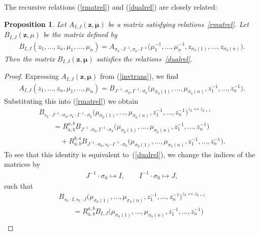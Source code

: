 \documentclass[10pt,a4paper]{amsart}
\def\zz{{\boldsymbol z}}
\def\mub{{\boldsymbol\mu}}
\numberwithin{equation}{section}
\newtheorem{Proposition}[Theorem]{Proposition}
 { \theoremstyle{definition}
\newtheorem{Definition}[Theorem]{Definition}
\newtheorem{Note}[Theorem]{Note}
\newtheorem{Example}[Theorem]{Example}
\newtheorem{Remark}[Theorem]{Remark} }
\begin{document}
The recursive relations (\ref{rmatrel}) and (\ref{dualrel}) are closely related:

\begin{Proposition} \label{prop1} Let $A_{I,J}(\zz,\mub)$ be a matrix satisfying relations~\eqref{rmatrel}. Let $B_{I,J}(\zz,\mu)$ be the matrix defined by
\begin{gather} \label{invtrans}
B_{I,J}(z_1,\dots, z_n,\mu_1,\dots,\mu_n)=A_{\sigma_{0}\cdot J^{-1},\sigma_{0}\cdot I^{-1}}\big(\mu_1^{-1},\dots,\mu_{n}^{-1},z_{\sigma_{0}(1)},\dots,z_{\sigma_{0}(n)}\big).
\end{gather}
Then the matrix $B_{I,J}(\zz,\mub)$ satisfies the relations~\eqref{dualrel}.
\end{Proposition}
\begin{proof}Expressing $A_{I,J}(\zz,\mub)$ from (\ref{invtrans}), we find
\begin{gather*}
A_{I,J}(z_1,\dots,z_{n},\mu_{1},\dots,\mu_{n}) = B_{J^{-1}\cdot \sigma_{0},I^{-1}\cdot \sigma_{0}}\big(\mu_{\sigma_{0}(1)},\dots,\mu_{\sigma_{0}(n)},z^{-1}_1,\dots, z_{n}^{-1}\big).
\end{gather*}
Substituting this into (\ref{rmatrel}) we obtain
\begin{gather*}
B_{s_k\cdot J^{-1} \cdot \sigma_{0},s_k\cdot I^{-1} \cdot \sigma_{0}}\big(\mu_{\sigma_{0}(1)},\dots,\mu_{\sigma_{0}(n)},z_{1}^{-1},\dots, z_{n}^{-1}\big)^{z_{k}\leftrightarrow z_{k+1}}\\
\qquad {}= R^{a,b}_{a,b} B_{J^{-1}\cdot \sigma_{0},I^{-1} \cdot \sigma_{0}}\big(\mu_{\sigma_{0}(1)},\dots,\mu_{\sigma_{0}(n)},z_{1}^{-1},\dots, z_{n}^{-1}\big)\\
\qquad \quad {} + R^{b,a}_{a,b} B_{J^{-1}\cdot \sigma_{0},s_k \cdot I^{-1} \cdot \sigma_{0}}\big(\mu_{\sigma_{0}(1)},\dots,\mu_{\sigma_{0}(n)},z_{1}^{-1},\dots, z_{n}^{-1}\big).
\end{gather*}
To see that this identity is equivalent to~(\ref{dualrel}), we change the indices of the matrices by
\begin{gather} \label{DualPoint}
J^{-1}\cdot \sigma_{0}\mapsto I, \qquad I^{-1}\cdot \sigma_{0}\mapsto J,
\end{gather}
such that
\begin{gather*}
 B_{s_k \cdot I ,s_k\cdot J }\big(\mu_{\sigma_{0}(1)},\dots,\mu_{\sigma_{0}(n)},z_{1}^{-1},\dots, z_{n}^{-1}\big)^{z_{k}\leftrightarrow z_{k+1}}\\
 \qquad{} =
 R^{a,b}_{a,b} B_{I,J}\big(\mu_{\sigma_{0}(1)},\dots,\mu_{\sigma_{0}(n)},z_{1}^{-1},\dots, z_{n}^{-1}\big)\\

\end{gather*}
\end{proof}
\end{document}
